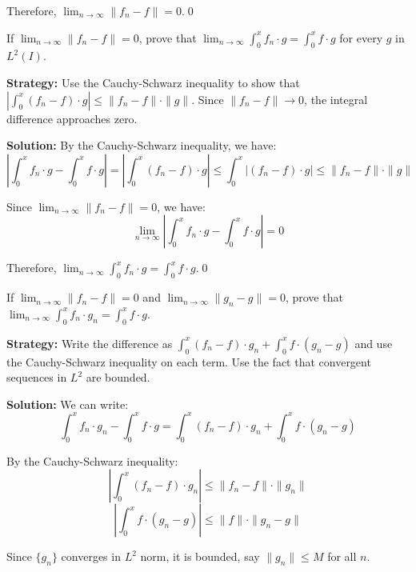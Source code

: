 Therefore, $\lim_{n \to \infty} \| f_n - f \| = 0$.\qed


\begin{problembox}
\begin{problemstatement}
If $\lim_{n \to \infty} \| f_n - f \| = 0$, prove that $\lim_{n \to \infty} \int_0^x f_n \cdot g = \int_0^x f \cdot g$ for every $g$ in $L^2(I)$.
\end{problemstatement}
\end{problembox}

\noindent\textbf{Strategy:} Use the Cauchy-Schwarz inequality to show that $|\int_0^x (f_n - f) \cdot g| \leq \| f_n - f \| \cdot \| g \|$. Since $\| f_n - f \| \to 0$, the integral difference approaches zero.

\bigskip\noindent\textbf{Solution:}
By the Cauchy-Schwarz inequality, we have:
\[\left|\int_0^x f_n \cdot g - \int_0^x f \cdot g\right| = \left|\int_0^x (f_n - f) \cdot g\right| \leq \int_0^x |(f_n - f) \cdot g| \leq \| f_n - f \| \cdot \| g \|\]

Since $\lim_{n \to \infty} \| f_n - f \| = 0$, we have:
\[\lim_{n \to \infty} \left|\int_0^x f_n \cdot g - \int_0^x f \cdot g\right| = 0\]

Therefore, $\lim_{n \to \infty} \int_0^x f_n \cdot g = \int_0^x f \cdot g$.\qed


\begin{problembox}
\begin{problemstatement}
If $\lim_{n \to \infty} \| f_n - f \| = 0$ and $\lim_{n \to \infty} \| g_n - g \| = 0$, prove that $\lim_{n \to \infty} \int_0^x f_n \cdot g_n = \int_0^x f \cdot g$.
\end{problemstatement}
\end{problembox}

\noindent\textbf{Strategy:} Write the difference as $\int_0^x (f_n - f) \cdot g_n + \int_0^x f \cdot (g_n - g)$ and use the Cauchy-Schwarz inequality on each term. Use the fact that convergent sequences in $L^2$ are bounded.

\bigskip\noindent\textbf{Solution:}
We can write:
\[\int_0^x f_n \cdot g_n - \int_0^x f \cdot g = \int_0^x (f_n - f) \cdot g_n + \int_0^x f \cdot (g_n - g)\]

By the Cauchy-Schwarz inequality:
\[\left|\int_0^x (f_n - f) \cdot g_n\right| \leq \| f_n - f \| \cdot \| g_n \|\]
\[\left|\int_0^x f \cdot (g_n - g)\right| \leq \| f \| \cdot \| g_n - g \|\]

Since $\{g_n\}$ converges in $L^2$ norm, it is bounded, say $\| g_n \| \leq M$ for all $n$.


